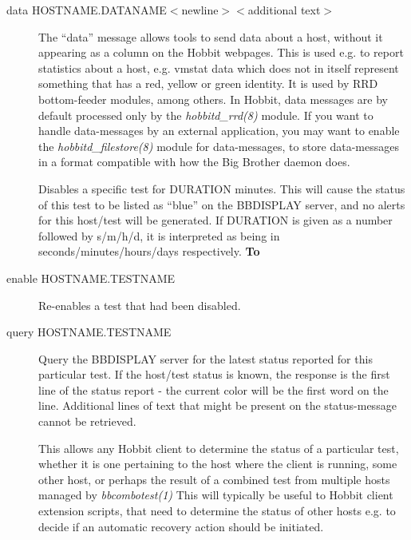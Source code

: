 \begin{description}
 

\item[data HOSTNAME.DATANAME$<$newline$>$$<$additional text$>$] The
 ``data'' message allows tools to send data about a host, without it
 appearing as a column on the Hobbit webpages. This is used e.g. to
 report statistics about a host, e.g. vmstat data which does not in
 itself represent something that has a red, yellow or green
 identity. It is used by RRD bottom-feeder modules, among others. In
 Hobbit, data messages are by default processed only by the
 \emph{hobbitd\_rrd(8)} module. If you want to handle data-messages by
 an external application, you may want to enable the
 \emph{hobbitd\_filestore(8)}  module for data-messages, to store
 data-messages in a format compatible with how the Big Brother daemon
 does. 


 Disables a specific test for DURATION minutes. This will cause the
 status of this test to be listed as ``blue'' on the BBDISPLAY server,
 and no alerts for this host/test will be generated. If DURATION is
 given as a number followed by s/m/h/d, it is interpreted as being in
 seconds/minutes/hours/days respectively. \textbf{To} 



\item[enable HOSTNAME.TESTNAME] Re-enables a test that had been disabled. 

 

\item[query HOSTNAME.TESTNAME] Query the BBDISPLAY server for the
  latest status reported for this particular test. If the host/test
  status is known, the response is the first line of the status report
  - the current color will be the first word on the line. Additional
  lines of text that might be present on the status-message cannot be
  retrieved.  

 This allows any Hobbit client to determine the status of a particular
 test, whether it is one pertaining to the host where the client is
 running, some other host, or perhaps the result of a combined test
 from multiple hosts managed by \emph{bbcombotest(1)} This will
 typically be useful to Hobbit client extension scripts, that need to
 determine the status of other hosts e.g. to decide if an automatic
 recovery action should be initiated. 



\end{description}
